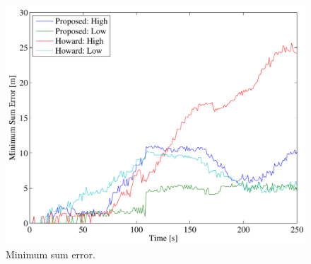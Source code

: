 \begin{figure}[ht]
\centering
\includegraphics[width=\columnwidth]{../FinalFigures/MinSumError}
\caption{Minimum sum error.}
\label{fig:minsumerr}
\end{figure}
